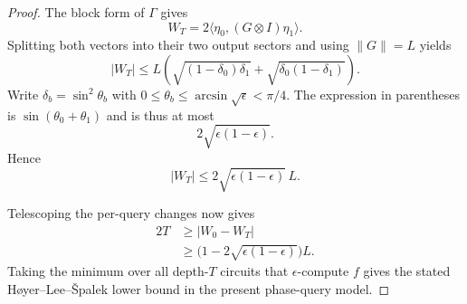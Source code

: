 \documentclass[11pt]{article}
\numberwithin{equation}{section}
\theoremstyle{remark}
\begin{document}
\begin{proof}
The block form of $\Gamma$ gives
\begin{equation}
    W_T
    =
    2\langle\eta_0,(G\otimes I)\eta_1\rangle.
\end{equation}
Splitting both vectors into their two output sectors and using $\|G\|=L$
yields
\begin{equation}
    |W_T|
    \leq
    L\left(
        \sqrt{(1-\delta_0)\delta_1}
        +
        \sqrt{\delta_0(1-\delta_1)}
    \right).
\end{equation}
Write $\delta_b=\sin^2\theta_b$ with
$0\leq\theta_b\leq\arcsin\sqrt\epsilon<\pi/4$. The expression in
parentheses is $\sin(\theta_0+\theta_1)$ and is thus at most
\begin{equation}
    2\sqrt{\epsilon(1-\epsilon)}.
\end{equation}
Hence
\begin{equation}
    |W_T|
    \leq
    2\sqrt{\epsilon(1-\epsilon)}\,L.
\end{equation}

Telescoping the per-query changes now gives
\begin{equation}
\begin{aligned}
    2T
    &\geq |W_0-W_T|\\
    &\geq
    \bigl(1-2\sqrt{\epsilon(1-\epsilon)}\bigr)L.
\end{aligned}
\end{equation}
Taking the minimum over all depth-$T$ circuits that $\epsilon$-compute $f$ gives the stated H{\o}yer--Lee--{\v S}palek lower bound in the present phase-query model.
\end{proof}
\end{document}
